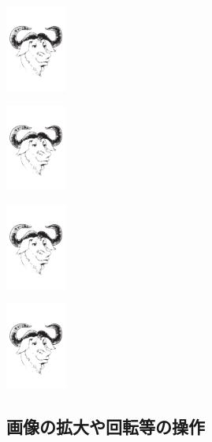 \begin{InOut}
\usepackage[dvipdfmx]{graphicx}
\includegraphics[width=2cm,
  trim=20 20 20 20]
  {images/gnu-head} 
\end{InOut}

\begin{InOut}
\usepackage[dvipdfmx]{graphicx}
\includegraphics[width=2cm,
  clip,viewport=131 304 459 548]
  {images/gnu-head}  
\end{InOut}

\begin{InOut}
\usepackage[dvipdfmx]{graphicx}
\includegraphics[width=2cm,angle=30,
  clip,viewport=131 304 459 548]
  {images/gnu-head}   
\end{InOut}

\begin{InOut}
\usepackage[dvipdfmx]{graphicx}
\includegraphics[width=2cm,angle=90,
  clip,viewport=131 304 459 548]
  {images/gnu-head}    
\end{InOut}

\subsection{画像の拡大や回転等の操作}

